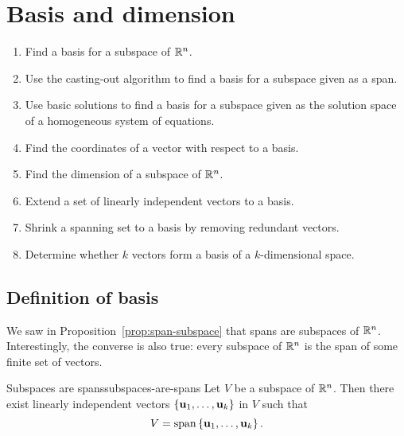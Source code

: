 \section{Basis and dimension}

\begin{outcome}
  \begin{enumerate}\setlength\itemsep{0em}
  \item Find a basis for a subspace of $\mathbb{R}^n$.
  \item Use the casting-out algorithm to find a basis for a subspace
    given as a span.
  \item Use basic solutions to find a basis for a subspace given as
    the solution space of a homogeneous system of equations.
  \item Find the coordinates of a vector with respect to a basis.
  \item Find the dimension of a subspace of $\mathbb{R}^n$.
  \item Extend a set of linearly independent vectors to a basis.
  \item Shrink a spanning set to a basis by removing redundant vectors.
  \item Determine whether $k$ vectors form a basis of a $k$-dimensional
    space.
  \end{enumerate}
\end{outcome}

\subsection{Definition of basis}

We saw in Proposition~\ref{prop:span-subspace} that spans are
subspaces of\/ $\mathbb{R}^n$. Interestingly, the converse is also true: every
subspace of\/ $\mathbb{R}^n$ is the span of some finite set of vectors.

\begin{theorem}{Subspaces are spans}{subspaces-are-spans}
  Let $V$ be a subspace of\/ $\mathbb{R}^n$. Then there exist linearly
  independent vectors $\left\{\mbox{\bf u}_{1},\ldots,\mbox{\bf u}_{k}\right\}$ in $V$
  such that
  \begin{equation*}
    V= \sspan\set{\vect{u}_{1},\ldots ,\vect{u}_{k}}.
  \end{equation*}
  \vspace{-3ex}
\end{theorem}

